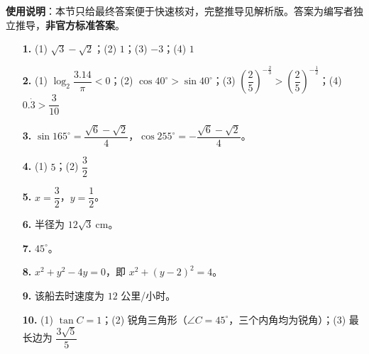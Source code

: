 
\begin{gknotice}
\textbf{使用说明}：本节只给最终答案便于快速核对，完整推导见解析版。答案为编写者独立推导，\textbf{非官方标准答案}。
\end{gknotice}

\begin{itemize}[leftmargin=2.6em]
  \item[\textbf{1.}] (1) $\sqrt{3}-\sqrt{2}$；(2) $1$；(3) $-3$；(4) $1$
  \item[\textbf{2.}] (1) $\log_{2}\dfrac{3.14}{\pi}<0$；(2) $\cos40^{\circ}>\sin40^{\circ}$；(3) $\left(\dfrac{2}{5}\right)^{-\frac{2}{3}}>\left(\dfrac{2}{5}\right)^{-\frac{1}{2}}$；(4) $0.\dot{3}>\dfrac{3}{10}$
  \item[\textbf{3.}] $\sin165^{\circ}=\dfrac{\sqrt{6}-\sqrt{2}}{4}$，$\cos255^{\circ}=-\dfrac{\sqrt{6}-\sqrt{2}}{4}$。
  \item[\textbf{4.}] (1) $5$；(2) $\dfrac{3}{2}$
  \item[\textbf{5.}] $x=\dfrac{3}{2}$，$y=\dfrac{1}{2}$。
  \item[\textbf{6.}] 半径为 $12\sqrt{3}\ \mathrm{cm}$。
  \item[\textbf{7.}] $45^{\circ}$。
  \item[\textbf{8.}] $x^{2}+y^{2}-4y=0$，即 $x^{2}+(y-2)^{2}=4$。
  \item[\textbf{9.}] 该船去时速度为 $12$ 公里/小时。
  \item[\textbf{10.}] (1) $\tan C=1$；(2) 锐角三角形（$\angle C=45^{\circ}$，三个内角均为锐角）；(3) 最长边为 $\dfrac{3\sqrt{5}}{5}$
\end{itemize}
